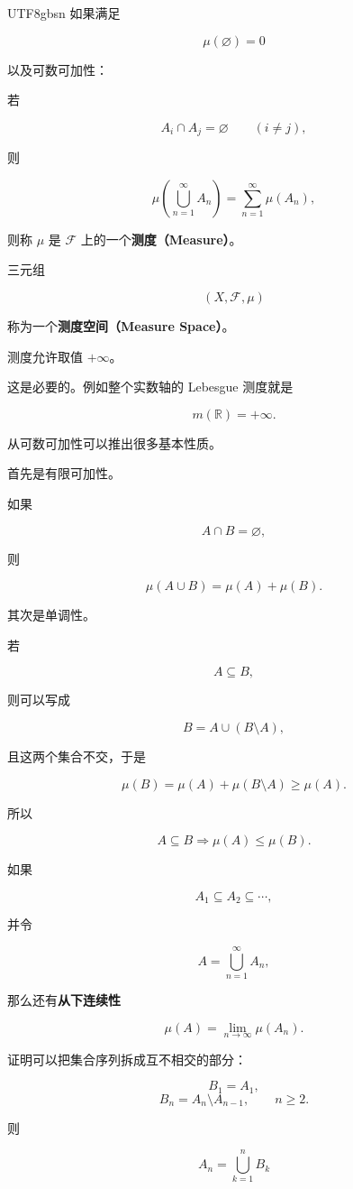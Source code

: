 \documentclass[11pt]{article}
\begin{document}
\begin{CJK*}{UTF8}{gbsn}
如果满足

\[
\mu(\varnothing)=0
\]

以及可数可加性：

若

\[
A_{i}\cap A_{j}=\varnothing\qquad(i\ne j),
\]

则

\[
\mu\left(\bigcup_{n=1}^{\infty}A_{n}\right)=\sum_{n=1}^{\infty}\mu(A_{n}),
\]

则称 $\mu$ 是 $\mathcal{F}$ 上的一个\textbf{测度（Measure）}。

三元组

\[
(X,\mathcal{F},\mu)
\]

称为一个\textbf{测度空间（Measure Space）}。

测度允许取值 $+\infty$。

这是必要的。例如整个实数轴的 Lebesgue 测度就是

\[
m(\mathbb{R})=+\infty.
\]

从可数可加性可以推出很多基本性质。

首先是有限可加性。

如果

\[
A\cap B=\varnothing,
\]

则

\[
\mu(A\cup B)=\mu(A)+\mu(B).
\]

其次是单调性。

若

\[
A\subseteq B,
\]

则可以写成

\[
B=A\cup(B\setminus A),
\]

且这两个集合不交，于是

\[
\mu(B)=\mu(A)+\mu(B\setminus A)\geq\mu(A).
\]

所以

\[
A\subseteq B\Longrightarrow\mu(A)\leq\mu(B).
\]

如果

\[
A_{1}\subseteq A_{2}\subseteq\cdots,
\]

并令

\[
A=\bigcup_{n=1}^{\infty}A_{n},
\]

那么还有\textbf{从下连续性}

\[
\mu(A)=\lim_{n\to\infty}\mu(A_{n}).
\]

证明可以把集合序列拆成互不相交的部分：

\[
B_{1}=A_{1},
\]
\[
B_{n}=A_{n}\setminus A_{n-1},\qquad n\geq2.
\]

则

\[
A_{n}=\bigcup_{k=1}^{n}B_{k}
\]


\end{CJK*}
\end{document}
